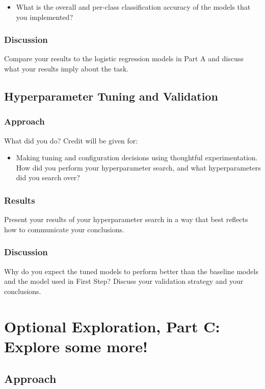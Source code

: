 \documentclass[11pt]{article}
\begin{document}
\begin{itemize}
\item  What is the overall and per-class classification accuracy of the models that you implemented?
\end{itemize}


\subsubsection{Discussion}
Compare your results to the logistic regression models in Part A and discuss what your results imply about the task.


\subsection{Hyperparameter Tuning and Validation}

\subsubsection{Approach}
What did you do? Credit will be given for:

  \begin{itemize}
  \item Making tuning and configuration decisions using thoughtful experimentation.  
    How did you perform your hyperparameter search, and what hyperparameters did you search over?
  \end{itemize}

\subsubsection{Results}
Present your results of your hyperparameter search in a way that best reflects how to communicate your conclusions.

\subsubsection{Discussion}

Why do you expect the tuned models to perform better than the baseline models and the model used in First Step? Discuss your validation strategy and your conclusions.

\section{Optional Exploration, Part C: Explore some more!}
\subsection{Approach}
\end{document}
